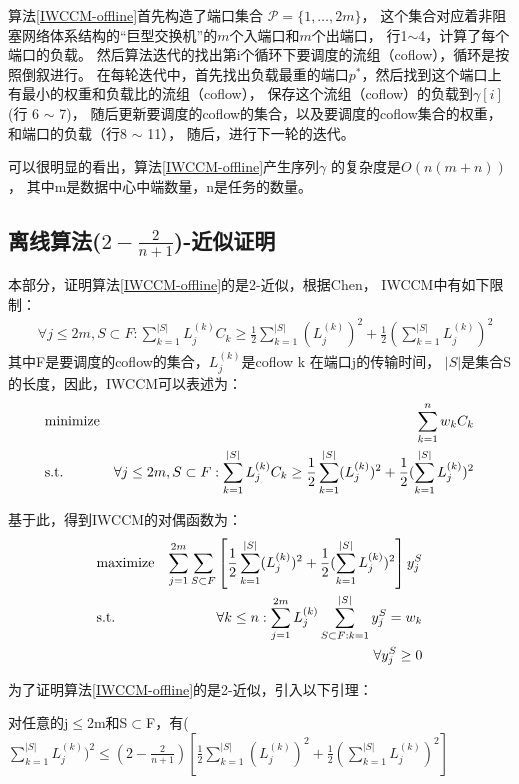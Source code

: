  
 算法\ref{IWCCM-offline}首先构造了端口集合 $\mathcal{P}=\{1, \dots, 2m\}$，
 这个集合对应着非阻塞网络体系结构的“巨型交换机”的$m$个入端口和$m$个出端口，
 行1$\sim$4，计算了每个端口的负载。
 然后算法迭代的找出第i个循环下要调度的流组（coflow），循环是按照倒叙进行。
 在每轮迭代中，首先找出负载最重的端口$p^*$，然后找到这个端口上有最小的权重和负载比的流组（coflow），
 保存这个流组（coflow）的负载到$\gamma[i]$(行 6 $\sim$ 7)，
 随后更新要调度的coflow的集合，以及要调度的coflow集合的权重，和端口的负载（行8 $\sim$ 11），
 随后，进行下一轮的迭代。
 
 可以很明显的看出，算法\ref{IWCCM-offline}产生序列$\gamma$ 的复杂度是$O(n(m+n))$，
 其中m是数据中心中端数量，n是任务的数量。
 
 \subsection{离线算法($2-\frac{2}{n+1}$)-近似证明}
 本部分，证明算法\ref{IWCCM-offline}的是2-近似，根据Chen\cite{chen2000supply}，
 IWCCM中有如下限制：
 \begin{eqnarray}
  &\forall j \leq 2m, S \subset F: \sum_{k=1}^{|S|} L_{j}^{(k)} C_{k} \geq \frac{1}{2}\sum_{k=1}^{|S|} (L_{j}^{(k)})^2+ \frac{1}{2}(\sum_{k=1}^{|S|} L_{j}^{(k)})^2
\end{eqnarray}
其中F是要调度的coflow的集合，$L_{j}^{(k)}$是coflow k 在端口j的传输时间，
$|S|$是集合S的长度，因此，IWCCM可以表述为：
 \begin{eqnarray}
 & {\rm minimize} & \sum_{k=1}^{n} w_{k} C_{k} \label{eq:WCCO-SC2} \\
& {\rm s.t.} &\forall j \leq 2m, S \subset F: \sum_{k=1}^{|S|} L_{j}^{(k)} C_{k} \geq \frac{1}{2}\sum_{k=1}^{|S|} (L_{j}^{(k)})^2+ \frac{1}{2}(\sum_{k=1}^{|S|} L_{j}^{(k)})^2  \label{eq:IWCCM-SC3}
\end{eqnarray}

基于此，得到IWCCM的对偶函数为：
 \begin{eqnarray}\label{IWCCTM4}
 & {\rm maximize} & \sum_{j=1}^{2m}\sum_{S\subset F}\left [\frac{1}{2}\sum_{k=1}^{|S|} (L_{j}^{(k)})^2+ \frac{1}{2}(\sum_{k=1}^{|S|} L_{j}^{(k)})^2 \right ] y_j^S\label{eq:WCCO-SC4} \\
& {\rm s.t.} & \forall k\leq n:\sum_{j=1}^{2m} L_{j}^{(k)} \sum_{S\subset F:k=1}^{|S|} y_j^S=w_k  \label{eq:IWCCM-SC5}\\
& & \forall  y_j^S\geq 0  \label{eq:IWCCM-SC6}
\end{eqnarray}

为了证明算法\ref{IWCCM-offline}的是2-近似，引入以下引理：
 \begin{lemma}\label{IWCCTM-proof3}
 对任意的j$\leq $2m和S$\subset$F，有($\sum_{k=1}^{|S|}L_{j}^{(k)})^2\leq (2-\frac{2}{n+1})\left [ \frac{1}{2}\sum_{k=1}^{|S|} (L_{j}^{(k)})^2+ \frac{1}{2}(\sum_{k=1}^{|S|} L_{j}^{(k)})^2 \right ]$
\end{lemma}

